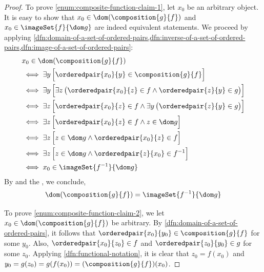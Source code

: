\begin{proof}
    \vspace{0.3cm}
    \noindent
    To prove \ref{enum:composite-function-claim-1}, let \( x_{0} \) be an arbitrary object.
    It is easy to show that \( x_{0} \in \dom \mleft( \composition{g}{f} \mright) \) and
    \( x_{0} \in \imageSet{f}{\dom g} \) are indeed equivalent statements.
    We proceed by applying
    \cref{dfn:domain-of-a-set-of-ordered-pairs,dfn:inverse-of-a-set-of-ordered-pairs,dfn:image-of-a-set-of-ordered-pairs}:
    \begin{align*}
        &x_{0} \in \dom \mleft( \composition{g}{f} \mright) \\
        &\iff
        \exists y \, \Big[ \orderedpair{x_{0}}{y} \in \composition{g}{f} \Big] \\
        &\iff
        \exists y \, \Big[ \exists z \, \big( \orderedpair{x_{0}}{z} \in f \land \orderedpair{z}{y} \in g \big) \Big] \\
        &\iff
        \exists z \, \Big[ \orderedpair{x_{0}}{z} \in f \land \exists y \, \big( \orderedpair{z}{y} \in g \big) \Big] \\
        &\iff
        \exists z \, \Big[ \orderedpair{x_{0}}{z} \in f \land z \in \dom g \Big] \\
        &\iff
        \exists z \, \Big[ z \in \dom g \land \orderedpair{x_{0}}{z} \in f \Big] \\
        &\iff
        \exists z \, \Big[ z \in \dom g \land \orderedpair{z}{x_{0}} \in f^{-1} \Big] \\
        &\iff
        x_{0} \in \imageSet{f^{-1}}{\dom g}
    \end{align*}
    By  and the ,
    we conclude,
    \begin{equation*}
        \dom \mleft( \composition{g}{f} \mright) = \imageSet{f^{-1}}{\dom g}
    \end{equation*}

    \vspace{0.3cm}
    \noindent
    To prove \ref{enum:composite-function-claim-2}, we let \( x_{0} \in \dom \mleft( \composition{g}{f} \mright) \) be arbitrary.
    By \cref{dfn:domain-of-a-set-of-ordered-pairs}, it follows that \( \orderedpair{x_{0}}{y_{0}} \in \composition{g}{f} \) for
    some \( y_{0} \). Also, \( \orderedpair{x_{0}}{z_{0}} \in f \) and \( \orderedpair{z_{0}}{y_{0}} \in g \) for some \( z_{0} \).
    Applying \cref{dfn:functional-notation}, it is clear that \( z_{0} = f(x_{0}) \) and
    \( y_{0} = g(z_{0}) = g(f(x_{0})) = \mleft( \composition{g}{f} \mright)(x_{0}) \).
\end{proof}

